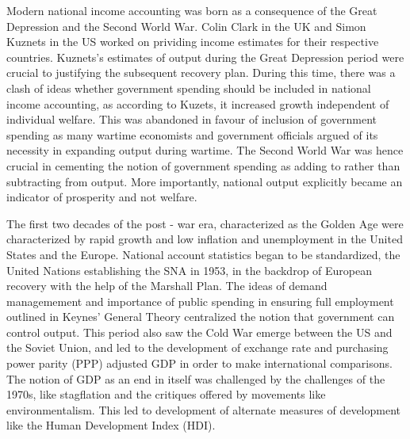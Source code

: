 \documentclass[12pt,nobind, a4paper]{reedthesis}
\begin{document}
 Modern national income accounting was born as a consequence of the Great Depression and the Second World War. Colin Clark in the UK and Simon Kuznets in the US worked on prividing income estimates for their respective countries. Kuznets's estimates of output during the Great Depression period were crucial to justifying the subsequent recovery plan. During this time, there was a clash of ideas whether government spending should be included in national income accounting, as according to Kuzets, it increased growth independent of individual welfare. This was abandoned in favour of inclusion of government spending as many wartime economists and government officials argued of its necessity in expanding output during wartime. The Second World War was hence crucial in cementing the notion of government spending as adding to rather than subtracting from output. More importantly, national output explicitly became an indicator of prosperity and not welfare.
 \linebreak

 The first two decades of the post - war era, characterized as the Golden Age were characterized by rapid growth and low inflation and unemployment in the United States and the Europe. National account statistics began to be standardized, the United Nations establishing the SNA in 1953, in the backdrop of European recovery with the help of the Marshall Plan. The ideas of demand managemement and importance of public spending in ensuring full employment outlined in Keynes' General Theory centralized the notion that government can control output. This period also saw the Cold War emerge between the US and the Soviet Union, and led to the development of exchange rate and purchasing power parity (PPP) adjusted GDP in order to make international comparisons. The notion of GDP as an end in itself was challenged by the challenges of the 1970s, like stagflation and the critiques offered by movements like environmentalism. This led to development of alternate measures of development like the Human Development Index (HDI).
 \linebreak
\end{document}

